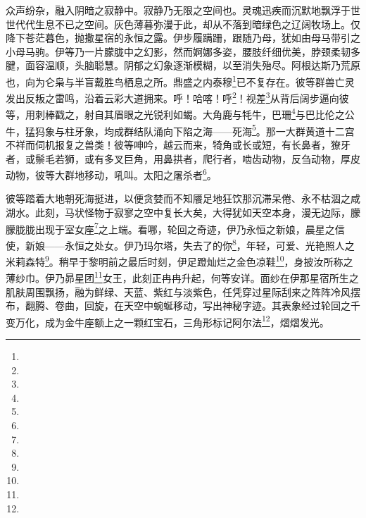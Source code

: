\par 众声纷杂，融入阴暗之寂静中。寂静乃无限之空间也。灵魂迅疾而沉默地飘浮于世世代代生息不已之空间。灰色薄暮弥漫于此，却从不落到暗绿色之辽阔牧场上。仅降下苍茫暮色，抛撒星宿的永恒之露。伊步履蹒跚，跟随乃母，犹如由母马带引之小母马驹。伊等乃一片朦胧中之幻影，然而婀娜多姿，腰肢纤细优美，脖颈柔韧多腱，面容温顺，头脑聪慧。阴郁之幻象逐渐模糊，以至消失殆尽。阿根达斯乃荒原也，向为仑枭与半盲戴胜鸟栖息之所。鼎盛之内泰穆\footnote{}已不复存在。彼等群兽亡灵发出反叛之雷鸣，沿着云彩大道拥来。呼！哈喀！呼\footnote{}！视差\footnote{}从背后阔步逼向彼等，用刺棒戳之，射自其眉眼之光锐利如蝎。大角鹿与牦牛，巴珊\footnote{}与巴比伦之公牛，猛犸象与柱牙象，均成群结队涌向下陷之海——死海\footnote{}。那一大群黄道十二宫不祥而伺机报复之兽类！彼等呻吟，越云而来，犄角或长或短，有长鼻者，獠牙者，或鬃毛若狮，或有多叉巨角，用鼻拱者，爬行者，啮齿动物，反刍动物，厚皮动物，彼等大群地移动，吼叫。太阳之屠杀者\footnote{}。
\par 彼等踏着大地朝死海挺进，以便贪婪而不知餍足地狂饮那沉滞呆倦、永不枯涸之咸湖水。此刻，马状怪物于寂寥之空中复长大矣，大得犹如天空本身，漫无边际，朦朦胧胧出现于室女座\footnote{}之上端。看哪，轮回之奇迹，伊乃永恒之新娘，晨星之信使，新娘——永恒之处女。伊乃玛尔塔，失去了的你\footnote{}，年轻，可爱、光艳照人之米莉森特\footnote{}。稍早于黎明前之最后时刻，伊足蹬灿烂之金色凉鞋\footnote{}，身披汝所称之薄纱巾。伊乃昴星团\footnote{}女王，此刻正冉冉升起，何等安详。面纱在伊那星宿所生之肌肤周围飘扬，融为鲜绿、天蓝、紫红与淡紫色，任凭穿过星际刮来之阵阵冷风摆布，翻腾、卷曲，回旋，在天空中蜿蜒移动，写出神秘字迹。其表象经过轮回之千变万化，成为金牛座额上之一颗红宝石，三角形标记阿尔法\footnote{}，熠熠发光。
